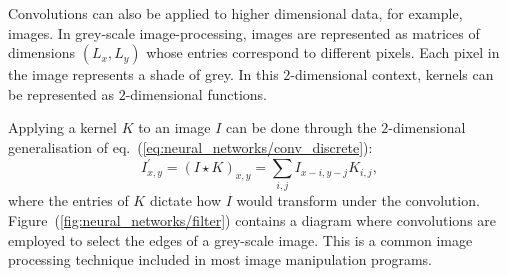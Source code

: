 Convolutions can also be applied to higher dimensional data, for example, images. In grey-scale
image-processing, images are represented as matrices of dimensions $(L_x, L_y)$ whose entries
correspond to different pixels. Each pixel in the image represents a shade of grey. In this
$2$-dimensional context, kernels can be represented as $2$-dimensional functions.

Applying a kernel $K$ to an image $I$ can be done through the $2$-dimensional generalisation of
eq.~(\ref{eq:neural_networks/conv_discrete}):
\begin{equation}
    I^\prime_{x, y} = {(I \star K)}_{x, y}  = \sum_{i, j} I_{x - i, y - j} K_{i, j},
    \label{eq:neural_networks/image_conv}
\end{equation}
where the entries of $K$ dictate how $I$ would transform under the convolution.
Figure~(\ref{fig:neural_networks/filter}) contains a diagram where convolutions are employed to
select the edges of a grey-scale image. This is a common image processing technique included in most
image manipulation programs.
 
